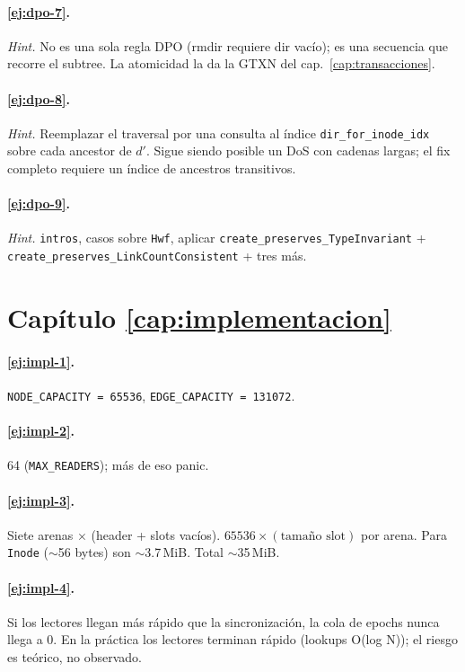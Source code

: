 \paragraph{\ref{ej:dpo-7}.} \emph{Hint.} No es una sola regla DPO
(rmdir requiere dir vacío); es una secuencia que recorre el subtree.
La atomicidad la da la GTXN del cap.~\ref{cap:transacciones}.

\paragraph{\ref{ej:dpo-8}.} \emph{Hint.} Reemplazar el traversal por
una consulta al índice \texttt{dir\_for\_inode\_idx} sobre cada
ancestor de $d'$. Sigue siendo posible un DoS con cadenas largas; el
fix completo requiere un índice de ancestros transitivos.

\paragraph{\ref{ej:dpo-9}.} \emph{Hint.} \texttt{intros}, casos sobre
\texttt{Hwf}, aplicar \texttt{create\_preserves\_TypeInvariant} +
\texttt{create\_preserves\_LinkCountConsistent} + tres más.

\section*{Capítulo \ref{cap:implementacion}}

\paragraph{\ref{ej:impl-1}.} \texttt{NODE\_CAPACITY = 65536},
\texttt{EDGE\_CAPACITY = 131072}.

\paragraph{\ref{ej:impl-2}.} 64 (\texttt{MAX\_READERS}); más de eso
panic.

\paragraph{\ref{ej:impl-3}.} Siete arenas $\times$ (header + slots
vacíos). $65536 \times (\text{tamaño slot})$ por arena. Para
\texttt{Inode} ($\sim$56 bytes) son $\sim$3.7\,MiB. Total $\sim$35\,MiB.

\paragraph{\ref{ej:impl-4}.} Si los lectores llegan más rápido que la
sincronización, la cola de epochs nunca llega a 0. En la práctica los
lectores terminan rápido (lookups O(log N)); el riesgo es teórico, no
observado.


